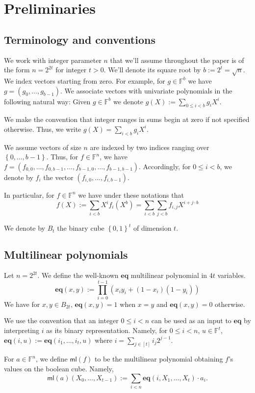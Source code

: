 \documentclass[11pt]{article} %
\newcommand{\F}{\ensuremath{\mathbb F}\xspace}
\newcommand{\defeq}{:=}
\newcommand{\set}[1]{\ensuremath{\left\{#1\right\}}\xspace}
\newcommand{\sumi}[1]{\sum_{i< #1}}
\newcommand{\sumj}[1]{\sum_{j< #1}}
\newcommand{\eq}{\ensuremath{\mathsf{eq}}\xspace}
\renewcommand{\eq}{\ensuremath{\mathbf{eq}}\xspace}
\newcommand{\mle}[1]{\ensuremath{\mathsf{ml}(#1)}\xspace}
\newcommand{\prodt}{\ensuremath{\prod_{i=0}^{t-1}}\xspace}
\newcommand{\B}[1]{\ensuremath{B_{#1}}\xspace}
\begin{document}
\section{Preliminaries}
\subsection{Terminology and conventions}\label{sec:terminology}
We work with integer parameter $n$ that we'll assume throughout the paper  is of the form
$n=2^{2t}$ for integer $t>0$. We'll denote its square root by $b\defeq 2^t=\sqrt{n}$.
We index vectors starting from zero. For example, for $g\in \F^b$ we have $g=(g_0,\ldots,g_{b-1})$.
We associate vectors with univariate polynomials in the following natural way:
Given $g\in \F^b$ we denote $g(X)\defeq \sum_{0\leq i < b} g_i X^i$.

We make the convention that integer ranges in sums begin at zero if not specified otherwise. Thus, we write
$g(X)=\sumi{b}g_i X^i$.

We assume vectors of size $n$ are indexed by two indices ranging over $\set{0,\ldots,b-1}$. Thus, for $f\in \F^n$, we have $f=(f_{0,0},\ldots,f_{0,b-1},\ldots,f_{b-1,0},\ldots,f_{b-1,b-1})$.
Accordingly, for $0\leq i <b$, we denote by $f_i$ the vector $(f_{i,0},\ldots, f_{i,b-1})$.

In particular, for $f\in \F^n$ we have under these notations that
\[f(X)\defeq \sumi{b}X^i f_i(X^b) = \sumi{b}\sumj{b}f_{i,j}X^{i+j\cdot b}\]
 
We denote by \B{t} the binary cube $\set{0,1}^t$ of dimension $t$.
\subsection{Multilinear polynomials}\label{sec:multilin-polys}
Let $n=2^{2t}$.
We define the well-known \eq multilinear polynomial in $4t$ variables. 
\[\eq(x,y) \defeq \prodt ( x_i y_i + (1-x_i)(1-y_i))\]
We have for $x,y \in \B{2t}$, $\eq(x,y)=1$ when $x=y$ and $\eq(x,y)=0$ otherwise.

We use the convention that an integer $0\leq i < n$ can be used as an input to \eq by interpreting $i$ as its binary representation.
Namely, for $0\leq i <n$, $u\in \F^t$, $\eq(i,u)\defeq \eq(i_1,\ldots, i_t,u)$ where $i=\sum_{j\in [t]} i_j 2^{j-1}$.

For $a\in \F^n$, we define $\mle{f}$ to be the multilinear polynomial obtaining $f$'s values on the boolean cube.
Namely,
\[\mle{a}(X_0,\ldots,X_{t-1}) \defeq \sumi{n}\eq(i,X_1,\ldots,X_t)\cdot a_i.\]
\end{document}
